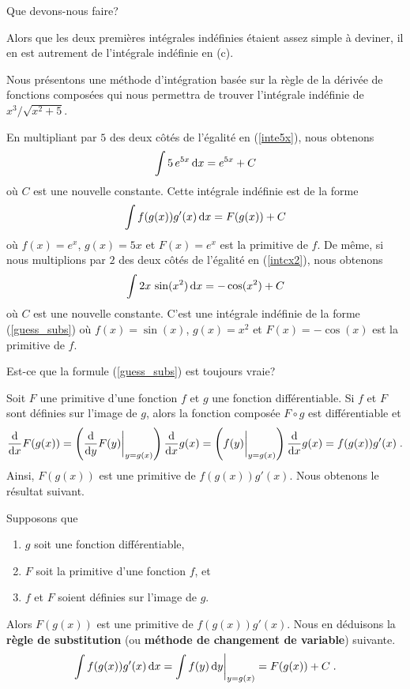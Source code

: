 {\begin{egg}
 Que devons-nous
faire?
\end{egg}

Alors que les deux premières intégrales indéfinies étaient assez
simple à deviner, il en est autrement de l'intégrale indéfinie en
(c).

Nous présentons une méthode d'intégration basée sur la règle de la
dérivée de fonctions composées qui nous permettra de trouver
l'intégrale indéfinie de $x^3/\sqrt{x^2+5}$.

En multipliant par $5$ des deux côtés de l'égalité en (\ref{inte5x}),
nous obtenons
\[
\int 5\,e^{5x}  \dx{x} = e^{5x} + C
\]
où $C$ est une nouvelle constante.  Cette intégrale indéfinie est de
la forme
\begin{equation}\label{guess_subs}
\int f(g(x)) g'(x)  \dx{x} = F(g(x)) + C
\end{equation}
où $f(x)=e^x$, $g(x)=5x$ et $F(x)=e^x$ est la primitive de $f$.
De même, si nous multiplions par $2$ des deux côtés de l'égalité en
(\ref{intcx2}), nous obtenons
\[
\int 2x\,\sin(x^2)  \dx{x} = -\cos(x^2) + C
\]
où $C$ est une nouvelle constante.  C'est une intégrale indéfinie de
la forme (\ref{guess_subs}) où $f(x)=\sin(x)$, $g(x)=x^2$ et
$F(x) = -\cos(x)$ est la primitive de $f$.

Est-ce que la formule (\ref{guess_subs}) est toujours vraie?

Soit $F$ une primitive d'une fonction $f$ et $g$ une fonction
différentiable.  Si $f$ et $F$ sont définies sur l'image de $g$, alors
la fonction composée $F\circ g$ est différentiable et
\[
\dfdx{F(g(x))}{x} = \left(\dfdx{F(y)}{y}\bigg|_{y=g(x)}\right) \dfdx{g(x)}{x}
= \left( f(y) \bigg|_{y=g(x)}\right) \dfdx{g(x)}{x} = f(g(x)) g'(x) \; .
\]
Ainsi, $F(g(x))$ est une primitive de $f(g(x))g'(x)$.  Nous obtenons le
résultat suivant.

\begin{focus}{\thm} 
Supposons que
\begin{enumerate}
\item $g$ soit une fonction différentiable,
\item $F$ soit la primitive d'une fonction $f$, et
\item $f$ et $F$ soient définies sur l'image de $g$.
\end{enumerate}
Alors $F(g(x))$ est une primitive de $f(g(x))g'(x)$.  Nous en déduisons la
{\bfseries règle de substitution}
(ou {\bfseries méthode de changement de variable}) suivante.
\[
\int f(g(x))g'(x)  \dx{x} = \int f(y) \dx{y} \bigg|_{y=g(x)} =
F(g(x)) + C \; .
\]
\end{focus}

}
